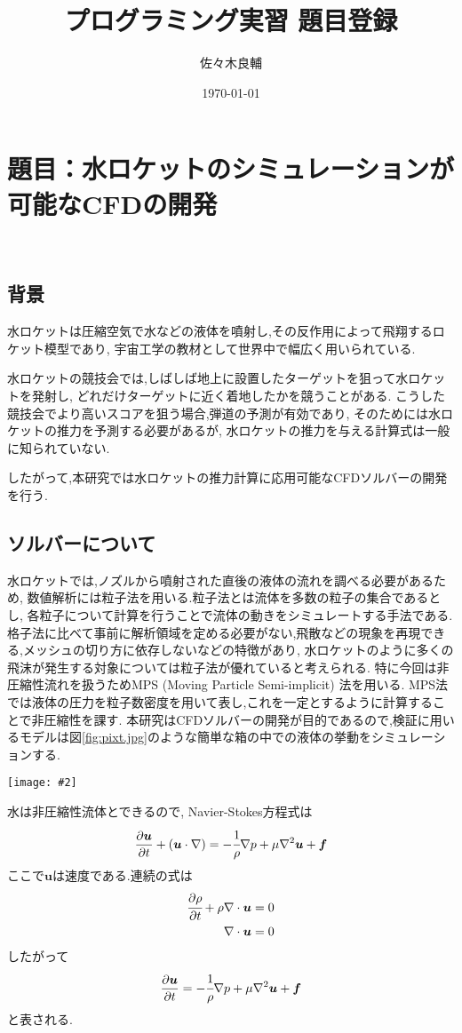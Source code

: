 \documentclass[uplatex,a4j,11pt]{jsarticle}
\makeatletter
\def\fgcaption{\def\@captype{figure}\caption}
\newcommand{\mfig}[3][width=15cm]{
\begin{center}
    \texttt{[image: \#2]}
\fgcaption{#3 \label{fig:#2}}
\end{center}
}
\makeatother
\begin{document}
\title{プログラミング実習 題目登録}
\author{佐々木良輔}
\date{\today}
\maketitle

\section*{題目：水ロケットのシミュレーションが可能なCFDの開発}
\
\subsection{背景}
水ロケットは圧縮空気で水などの液体を噴射し,その反作用によって飛翔するロケット模型であり,
宇宙工学の教材として世界中で幅広く用いられている.

水ロケットの競技会では,しばしば地上に設置したターゲットを狙って水ロケットを発射し,
どれだけターゲットに近く着地したかを競うことがある.
こうした競技会でより高いスコアを狙う場合,弾道の予測が有効であり,
そのためには水ロケットの推力を予測する必要があるが,
水ロケットの推力を与える計算式は一般に知られていない.

したがって,本研究では水ロケットの推力計算に応用可能なCFDソルバーの開発を行う.
\subsection{ソルバーについて}
水ロケットでは,ノズルから噴射された直後の液体の流れを調べる必要があるため,
数値解析には粒子法を用いる.粒子法とは流体を多数の粒子の集合であるとし,
各粒子について計算を行うことで流体の動きをシミュレートする手法である.
格子法に比べて事前に解析領域を定める必要がない,飛散などの現象を再現できる,メッシュの切り方に依存しないなどの特徴があり,
水ロケットのように多くの飛沫が発生する対象については粒子法が優れていると考えられる.
特に今回は非圧縮性流れを扱うためMPS (Moving Particle Semi-implicit) 法を用いる.\cite{ryuusi}\cite{ELEM13}
MPS法では液体の圧力を粒子数密度を用いて表し,これを一定とするように計算することで非圧縮性を課す.
本研究はCFDソルバーの開発が目的であるので,検証に用いるモデルは図\ref{fig:pixt.jpg}のような簡単な箱の中での液体の挙動をシミュレーションする.
\mfig[width=6cm]{pixt.jpg}{検証モデル(青点：液体粒子,灰点：壁)\cite{ELEM13}}
水は非圧縮性流体とできるので, Navier-Stokes方程式は
\begin{align}
    \label{NSequ}
    \frac{\partial\bm{u}}{\partial t}+(\bm{u}\cdot\nabla)=-\cfrac{1}{\rho}\nabla p+\mu\nabla^2\bm{u}+\bm{f}
\end{align}
ここで$\bm{u}$は速度である.連続の式は
\begin{align}
    \label{cont1}
    \cfrac{\partial\rho}{\partial t}+\rho\nabla\cdot\bm{u}=0\\
    \label{cont2}
    \nabla\cdot\bm{u}=0
\end{align}
したがって
\begin{align}
    \label{NSequ2}
    \frac{\partial\bm{u}}{\partial t}=-\cfrac{1}{\rho}\nabla p+\mu\nabla^2\bm{u}+\bm{f}
\end{align}
と表される.
\end{document}
